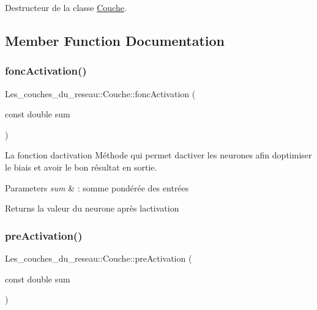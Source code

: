 Destructeur de la classe \hyperlink{class_les__couches__du__reseau_1_1_couche}{Couche}. 



\subsection{Member Function Documentation}
\mbox{\label{class_les__couches__du__reseau_1_1_couche_a9b51a1bfb515f466695e1f512da418e6}} 
\subsubsection{\texorpdfstring{fonc\+Activation()}{foncActivation()}}
{\footnotesize\ttfamily Les\+\_\+couches\+\_\+du\+\_\+reseau\+::\+Couche\+::fonc\+Activation (\begin{DoxyParamCaption}\item[{const double}]{sum }\end{DoxyParamCaption})}



La fonction d\textquotesingle{}activation Méthode qui permet d\textquotesingle{}activer les neurones afin d\textquotesingle{}optimiser le biais et avoir le bon résultat en sortie. 


\begin{DoxyParams}{Parameters}
{\em sum} & \+: somme pondérée des entrées \\
\hline
\end{DoxyParams}
\begin{DoxyReturn}{Returns}
la valeur du neurone après l\textquotesingle{}activation 
\end{DoxyReturn}
\mbox{\label{class_les__couches__du__reseau_1_1_couche_aee74a863eca708b4271ca2f35d24ab9b}} 
\subsubsection{\texorpdfstring{pre\+Activation()}{preActivation()}}
{\footnotesize\ttfamily Les\+\_\+couches\+\_\+du\+\_\+reseau\+::\+Couche\+::pre\+Activation (\begin{DoxyParamCaption}\item[{const double}]{sum }\end{DoxyParamCaption})}



